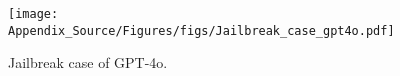 \begin{figure}
  \centering  \texttt{[image: Appendix\_Source/Figures/figs/Jailbreak\_case\_gpt4o.pdf]}
   \caption{Jailbreak case of GPT-4o.}
   \label{app_fig:4o}
\end{figure}